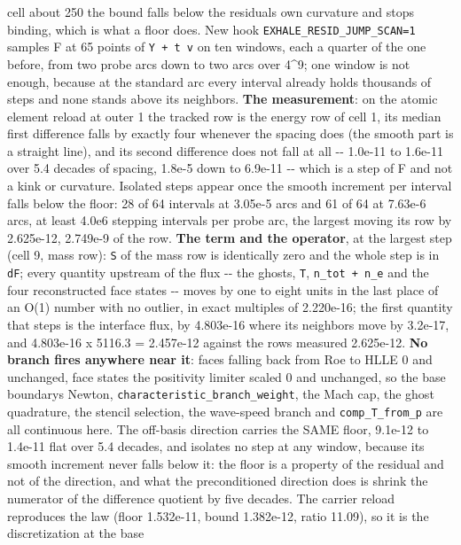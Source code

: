 \documentclass[english,a4paper]{my_memo}
\begin{document}
\begin{itemize}
  cell about 250 the bound falls below the residual\textquotesingle s own curvature and
  stops binding, which is what a floor does. New hook
  \texttt{EXHALE\_RESID\_JUMP\_SCAN=1} samples F at 65 points of \texttt{Y\ +\ t\ v} on ten
  windows, each a quarter of the one before, from two probe arcs down to
  two arcs over 4\^{}9; one window is not enough, because at the standard
  arc every interval already holds thousands of steps and none stands
  above its neighbors. \textbf{The measurement}: on the atomic element
  reload at outer 1 the tracked row is the energy row of cell 1, its
  median first difference falls by exactly four whenever the spacing
  does (the smooth part is a straight line), and its second difference
  does not fall at all -\/- 1.0e-11 to 1.6e-11 over 5.4 decades of
  spacing, 1.8e-5 down to 6.9e-11 -\/- which is a step of F and not a kink
  or curvature. Isolated steps appear once the smooth increment per
  interval falls below the floor: 28 of 64 intervals at 3.05e-5 arcs and
  61 of 64 at 7.63e-6 arcs, at least 4.0e6 stepping intervals per probe
  arc, the largest moving its row by 2.625e-12, 2.749e-9 of the row.
  \textbf{The term and the operator}, at the largest step (cell 9, mass row):
  \texttt{S} of the mass row is identically zero and the whole step is in \texttt{dF};
  every quantity upstream of the flux -\/- the ghosts, \texttt{T}, \texttt{n\_tot\ +\ n\_e}
  and the four reconstructed face states -\/- moves by one to eight units
  in the last place of an O(1) number with no outlier, in exact
  multiples of 2.220e-16; the first quantity that steps is the interface
  flux, by 4.803e-16 where its neighbors move by 3.2e-17, and
  4.803e-16 x 5116.3 = 2.457e-12 against the row\textquotesingle s measured 2.625e-12.
  \textbf{No branch fires anywhere near it}: faces falling back from Roe to
  HLLE 0 and unchanged, face states the positivity limiter scaled 0 and
  unchanged, so the base boundary\textquotesingle s Newton, \texttt{characteristic\_branch\_weight},
  the Mach cap, the ghost quadrature, the stencil selection, the
  wave-speed branch and \texttt{comp\_T\_from\_p} are all continuous here. The
  off-basis direction carries the SAME floor, 9.1e-12 to 1.4e-11 flat
  over 5.4 decades, and isolates no step at any window, because its
  smooth increment never falls below it: the floor is a property of the
  residual and not of the direction, and what the preconditioned
  direction does is shrink the numerator of the difference quotient by
  five decades. The carrier reload reproduces the law (floor 1.532e-11,
  bound 1.382e-12, ratio 11.09), so it is the discretization at the base

\end{itemize}
\end{document}
